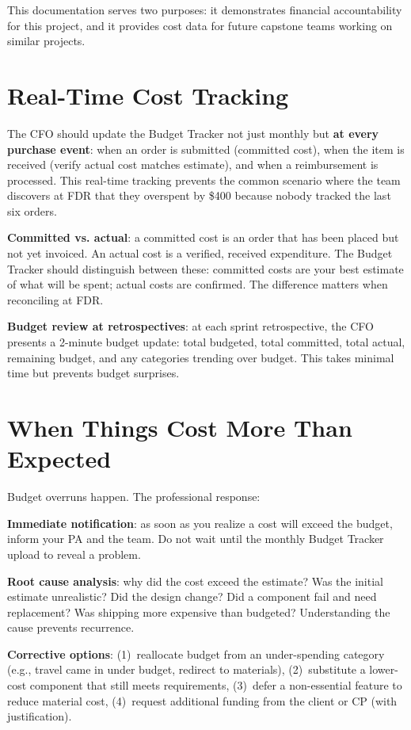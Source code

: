 This documentation serves two purposes: it demonstrates financial accountability for this project, and it provides cost data for future capstone teams working on similar projects.



\section{Real-Time Cost Tracking}
The CFO should update the Budget Tracker not just monthly but \textbf{at every purchase event}: when an order is submitted (committed cost), when the item is received (verify actual cost matches estimate), and when a reimbursement is processed. This real-time tracking prevents the common scenario where the team discovers at FDR that they overspent by \$400 because nobody tracked the last six orders.

\textbf{Committed vs. actual}: a committed cost is an order that has been placed but not yet invoiced. An actual cost is a verified, received expenditure. The Budget Tracker should distinguish between these: committed costs are your best estimate of what will be spent; actual costs are confirmed. The difference matters when reconciling at FDR.

\textbf{Budget review at retrospectives}: at each sprint retrospective, the CFO presents a 2-minute budget update: total budgeted, total committed, total actual, remaining budget, and any categories trending over budget. This takes minimal time but prevents budget surprises.

\section{When Things Cost More Than Expected}
Budget overruns happen. The professional response:

\textbf{Immediate notification}: as soon as you realize a cost will exceed the budget, inform your PA and the team. Do not wait until the monthly Budget Tracker upload to reveal a problem.

\textbf{Root cause analysis}: why did the cost exceed the estimate? Was the initial estimate unrealistic? Did the design change? Did a component fail and need replacement? Was shipping more expensive than budgeted? Understanding the cause prevents recurrence.

\textbf{Corrective options}: (1)~reallocate budget from an under-spending category (e.g., travel came in under budget, redirect to materials), (2)~substitute a lower-cost component that still meets requirements, (3)~defer a non-essential feature to reduce material cost, (4)~request additional funding from the client or CP (with justification).



